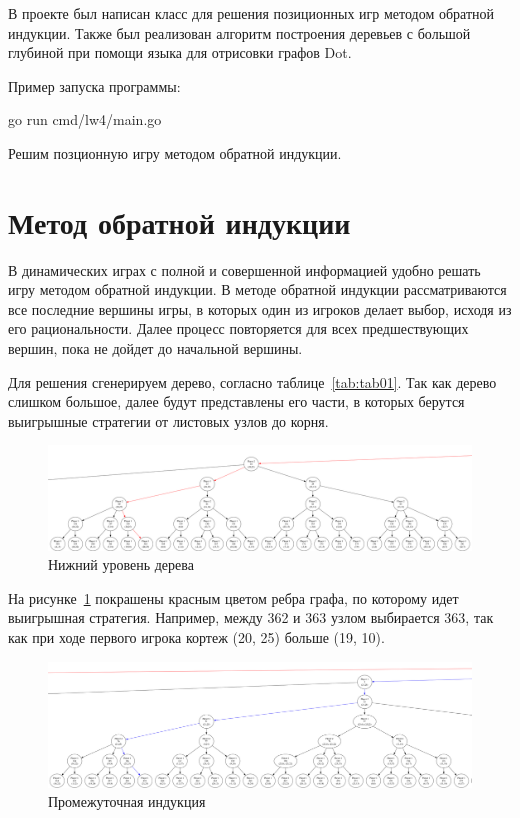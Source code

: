 
В проекте был написан класс для решения позиционных игр методом обратной индукции. Также
был реализован алгоритм построения деревьев с большой глубиной при помощи языка для
отрисовки графов Dot.

Пример запуска программы:

\begin{codelisting}[language=Bash]
    go run cmd/lw4/main.go
\end{codelisting}

Решим позционную игру методом обратной индукции.


\section{Метод обратной индукции}

В динамических играх с полной и совершенной информацией удобно решать игру методом
обратной индукции. В методе обратной индукции рассматриваются все последние вершины игры,
в которых один из игроков делает выбор, исходя из его рациональности. Далее процесс
повторяется для всех предшествующих вершин, пока не дойдет до начальной вершины.

Для решения сгенерируем дерево, согласно таблице~\ref{tab:tab01}. Так как дерево слишком
большое, далее будут представлены его части, в которых берутся выигрышные стратегии от
листовых узлов до корня.

\begin{figure}
  \centering
  \includegraphics[scale=0.3]{../../artifacts/lw4/1.png}
  \caption{Нижний уровень дерева}
  \label{fig:fig01}
\end{figure}

На рисунке~\ref{fig:fig01} покрашены красным цветом ребра графа, по которому идет
выигрышная стратегия. Например, между 362 и 363 узлом выбирается 363, так как при ходе
первого игрока кортеж (20, 25) больше (19, 10).

\begin{figure}
  \centering
  \includegraphics[scale=0.3]{../../artifacts/lw4/2.png}
  \caption{Промежуточная индукция}
  \label{fig:fig02}
\end{figure}

